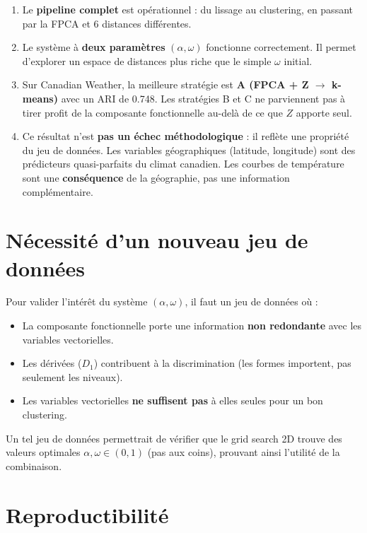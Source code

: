 \documentclass[11pt, a4paper]{article}
\theoremstyle{definition}
\theoremstyle{remark}
\begin{document}
\begin{enumerate}
  \item Le \textbf{pipeline complet} est opérationnel : du lissage au
    clustering, en passant par la FPCA et 6 distances différentes.

  \item Le système à \textbf{deux paramètres} $(\alpha, \omega)$ fonctionne
    correctement. Il permet d'explorer un espace de distances plus riche
    que le simple $\omega$ initial.

  \item Sur Canadian Weather, la meilleure stratégie est \textbf{A (FPCA + Z
    $\to$ k-means)} avec un ARI de 0.748. Les stratégies B et C ne parviennent
    pas à tirer profit de la composante fonctionnelle au-delà de ce que $Z$
    apporte seul.

  \item Ce résultat n'est \textbf{pas un échec méthodologique} : il reflète une
    propriété du jeu de données. Les variables géographiques (latitude,
    longitude) sont des prédicteurs quasi-parfaits du climat canadien. Les
    courbes de température sont une \textbf{conséquence} de la géographie,
    pas une information complémentaire.
\end{enumerate}

\section{Nécessité d'un nouveau jeu de données}
\label{sec:nouveau_dataset}

Pour valider l'intérêt du système $(\alpha, \omega)$, il faut un jeu de données
où :

\begin{itemize}
  \item La composante fonctionnelle porte une information \textbf{non
    redondante} avec les variables vectorielles.
  \item Les dérivées ($D_1$) contribuent à la discrimination (les formes
    importent, pas seulement les niveaux).
  \item Les variables vectorielles \textbf{ne suffisent pas} à elles seules
    pour un bon clustering.
\end{itemize}

Un tel jeu de données permettrait de vérifier que le grid search 2D trouve des
valeurs optimales $\alpha, \omega \in (0, 1)$ (pas aux coins), prouvant ainsi
l'utilité de la combinaison.

\section{Reproductibilité}
\end{document}
